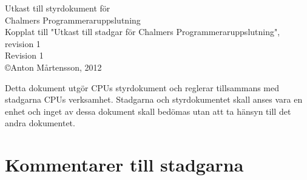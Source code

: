 \documentclass[a4paper]{article}
\def\CPU{CPU\xspace}
\begin{document}
\begin{center}
	{\Huge Utkast till styrdokument för} \\[0.5em]
	{\Huge Chalmers Programmeraruppslutning} \\[1em]
	{Kopplat till "Utkast till stadgar för Chalmers Programmeraruppslutning", revision 1} \\[1em]
	{Revision 1} \\
	{\copyright Anton Mårtensson, 2012}
\end{center}

Detta dokument utgör \CPU{s} styrdokument och reglerar tillsammans med stadgarna \CPU{s} verksamhet. Stadgarna och styrdokumentet skall anses vara en enhet och inget av dessa dokument skall bedömas utan att ta hänsyn till det andra dokumentet.

\section*{Kommentarer till stadgarna}
\def\commentheader#1{\textbf{#1}\\}


\end{document}
